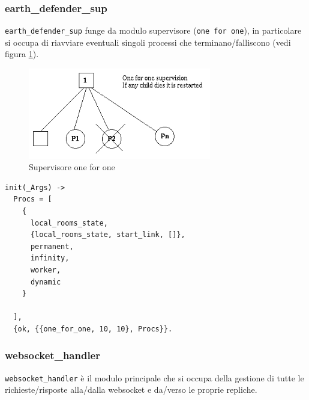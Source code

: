 \documentclass[paper=a4, fontsize=11pt]{scrartcl} %
\numberwithin{equation}{section} %
\numberwithin{figure}{section} %
\numberwithin{table}{section} %
\begin{document}
\subsubsection{earth\_defender\_sup}
\texttt{earth\_defender\_sup} funge da modulo supervisore (\texttt{one for one}), in particolare si occupa di riavviare eventuali singoli processi che terminano/falliscono (vedi figura \ref{Supervisor}).
\begin{figure}
\centering
\includegraphics[width=8cm]{sup4}
\caption{Supervisore one for one}
\label{Supervisor}
\end{figure}
\begin{lstlisting}[basicstyle=\footnotesize]
init(_Args) ->
  Procs = [
    {
      local_rooms_state,
      {local_rooms_state, start_link, []},
      permanent,
      infinity,
      worker,
      dynamic
    }
      
  ],
  {ok, {{one_for_one, 10, 10}, Procs}}.
\end{lstlisting}
\subsubsection{websocket\_handler}
\texttt{websocket\_handler} è il modulo principale che si occupa della gestione di tutte le richieste/risposte alla/dalla websocket e da/verso le proprie repliche.
\end{document}
